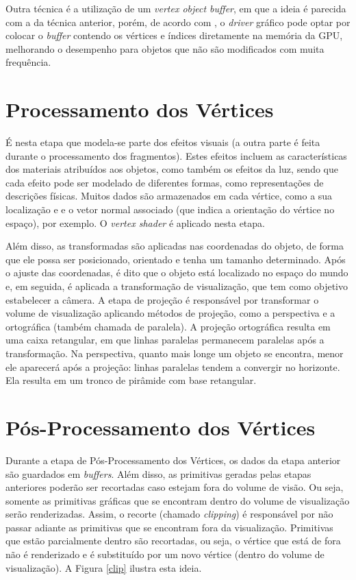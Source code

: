\begin{anexosenv}
	Outra técnica é a utilização de um  \textit{vertex object buffer}, em que a ideia é parecida com a da técnica anterior, porém, de acordo com \cite{vbo}, o \textit{driver} gráfico pode optar por colocar o \textit{buffer} contendo os vértices e índices diretamente na memória da GPU, melhorando o desempenho para objetos que não são modificados com muita frequência. 

\section{Processamento dos Vértices}

	É nesta etapa que modela-se parte dos efeitos visuais (a outra parte é feita durante o processamento dos fragmentos).  Estes efeitos incluem as características dos materiais atribuídos aos objetos, como também os efeitos da luz, sendo que cada efeito pode ser modelado de diferentes formas, como representações de descrições físicas. Muitos dados são armazenados em cada vértice, como a sua localização e e o vetor normal associado (que indica a orientação do vértice no espaço), por exemplo. O \textit{vertex shader} é aplicado nesta etapa.

	Além disso, as transformadas são aplicadas nas coordenadas do objeto, de forma que ele possa ser posicionado, orientado e tenha um tamanho determinado. Após o ajuste das coordenadas, é dito que o objeto está localizado no espaço do mundo e, em seguida, é aplicada a transformação de visualização, que tem como objetivo estabelecer a câmera. A etapa de projeção é responsável por transformar o volume de visualização aplicando métodos de projeção, como a perspectiva e a ortográfica (também chamada de paralela). A projeção ortográfica resulta em uma caixa retangular, em que linhas paralelas permanecem paralelas após a transformação. Na perspectiva, quanto mais longe um objeto se encontra, menor ele aparecerá após a projeção: linhas paralelas tendem a convergir no horizonte. Ela resulta em um tronco de pirâmide com base retangular. 
	
\section{Pós-Processamento dos Vértices}

	Durante a etapa de Pós-Processamento dos Vértices, os dados da etapa anterior são guardados em \textit{buffers}. Além disso, as primitivas geradas pelas etapas anteriores poderão ser recortadas caso estejam fora do volume de visão. Ou seja, somente as primitivas gráficas que se encontram dentro do volume de visualização serão renderizadas. Assim, o recorte (chamado \textit{clipping}) é responsável por não passar adiante as primitivas que se encontram fora da visualização. Primitivas que estão parcialmente dentro são recortadas, ou seja, o vértice que está de fora não é renderizado e é substituído por um novo vértice (dentro do volume de visualização). A  Figura \ref{clip} ilustra esta ideia.


\end{anexosenv}
